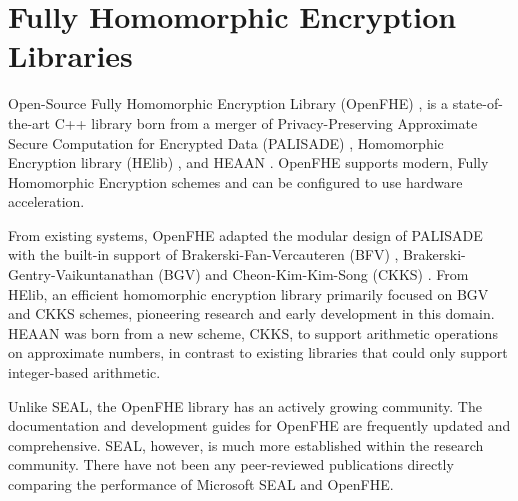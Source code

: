 \section{Fully Homomorphic Encryption Libraries}
\label{sec:Related FHE Libraries}
Open-Source Fully Homomorphic Encryption Library (OpenFHE) \cite{Al_Badawi2022-openFHE}, is a state-of-the-art C++ library born from a merger of Privacy-Preserving Approximate Secure Computation for Encrypted Data (PALISADE) \cite{PALISADE}, Homomorphic Encryption library (HElib) \cite{HElib}, and HEAAN \cite{Cheon2017-CKKS}. OpenFHE supports modern, Fully Homomorphic Encryption schemes and can be configured to use hardware acceleration.

From existing systems, OpenFHE adapted the modular design of PALISADE with the built-in support of Brakerski-Fan-Vercauteren (BFV) \cite{fan2012-bfv}, Brakerski-Gentry-Vaikuntanathan (BGV) \cite{brakerski2012-bgv} and Cheon-Kim-Kim-Song (CKKS) \cite{Cheon2017-CKKS}. From HElib, an efficient homomorphic encryption library primarily focused on BGV and CKKS schemes, pioneering research and early development in this domain. HEAAN was born from a new scheme, CKKS, to support arithmetic operations on approximate numbers, in contrast to existing libraries that could only support integer-based arithmetic.

Unlike SEAL, the OpenFHE library has an actively growing community. The documentation and development guides for OpenFHE are frequently updated and comprehensive. SEAL, however, is much more established within the research community. There have not been any peer-reviewed publications directly comparing the performance of Microsoft SEAL and OpenFHE.
